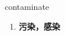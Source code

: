 
\begin{frame}
{\huge contaminate}
\begin{center}
\begin{enumerate}\Large
  \item \textbf{污染，感染}
\end{enumerate}
\end{center}
\end{frame}
